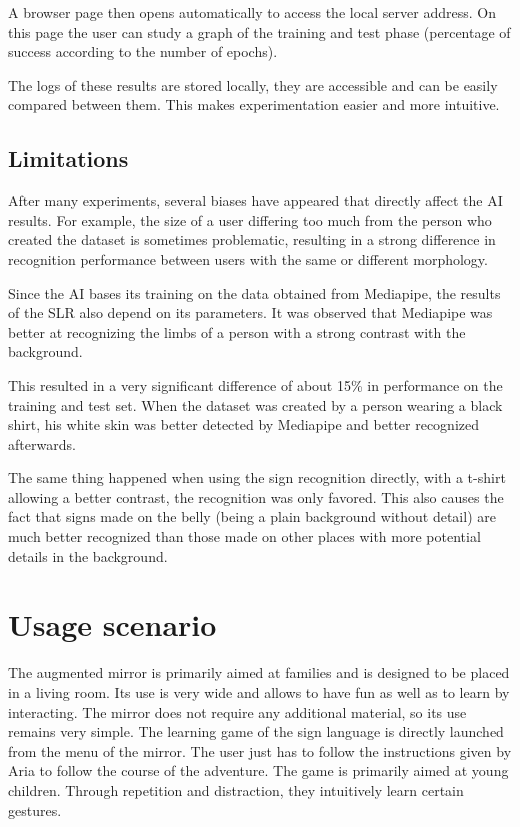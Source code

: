 A browser page then opens automatically to access the local server address. On this page the user can study a graph of the training and test phase (percentage of success according to the number of epochs). 

The logs of these results are stored locally, they are accessible and can be easily compared between them. This makes experimentation easier and more intuitive.

\subsection{Limitations}

After many experiments, several biases have appeared that directly affect the AI results. For example, the size of a user differing too much from the person who created the dataset is sometimes problematic, resulting in a strong difference in recognition performance between users with the same or different morphology. 

Since the AI bases its training on the data obtained from Mediapipe, the results of the SLR also depend on its parameters. It was observed that Mediapipe was better at recognizing the limbs of a person with a strong contrast with the background. 

This resulted in a very significant difference of about 15\% in performance on the training and test set. When the dataset was created by a person wearing a black shirt, his white skin was better detected by Mediapipe and better recognized afterwards. 

The same thing happened when using the sign recognition directly, with a t-shirt allowing a better contrast, the recognition was only favored. This also causes the fact that signs made on the belly (being a plain background without detail) are much better recognized than those made on other places with more potential details in the background.

\section{Usage scenario}

The augmented mirror is primarily aimed at families and is designed to be placed in a living room. Its use is very wide and allows to have fun as well as to learn by interacting.
The mirror does not require any additional material, so its use remains very simple.
The learning game of the sign language is directly launched from the menu of the mirror. The user just has to follow the instructions given by Aria to follow the course of the adventure. The game is primarily aimed at young children. Through repetition and distraction, they intuitively learn certain gestures.

